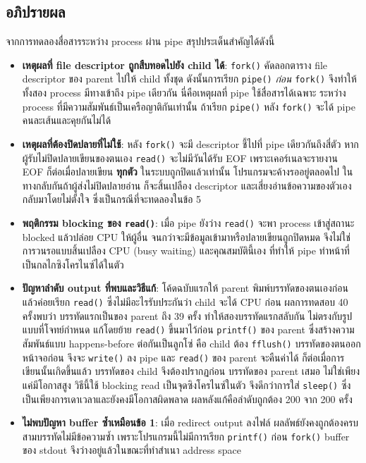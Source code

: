 \documentclass[a4paper,12pt]{article}
\newcommand{\code}[1]{\texttt{#1}}
\begin{document}
\subsection{อภิปรายผล}

จากการทดลองสื่อสารระหว่าง process ผ่าน pipe สรุปประเด็นสำคัญได้ดังนี้

\begin{itemize}[leftmargin=*]
  \item \textbf{เหตุผลที่ file descriptor ถูกสืบทอดไปยัง child ได้}:
        \code{fork()} คัดลอกตาราง file descriptor ของ parent ไปให้ child ทั้งชุด
        ดังนั้นการเรียก \code{pipe()} \emph{ก่อน} \code{fork()} จึงทำให้ทั้งสอง
        process มีทางเข้าถึง pipe เดียวกัน นี่คือเหตุผลที่ pipe ใช้สื่อสารได้เฉพาะ
        ระหว่าง process ที่มีความสัมพันธ์เป็นเครือญาติกันเท่านั้น
        ถ้าเรียก \code{pipe()} หลัง \code{fork()} จะได้ pipe คนละเส้นและคุยกันไม่ได้

  \item \textbf{เหตุผลที่ต้องปิดปลายที่ไม่ใช้}:
        หลัง \code{fork()} จะมี descriptor ชี้ไปที่ pipe เดียวกันถึงสี่ตัว
        หากผู้รับไม่ปิดปลายเขียนของตนเอง \code{read()} จะไม่มีวันได้รับ EOF
        เพราะเคอร์เนลจะรายงาน EOF ก็ต่อเมื่อปลายเขียน \textbf{ทุกตัว}
        ในระบบถูกปิดแล้วเท่านั้น โปรแกรมจะค้างรออยู่ตลอดไป
        ในทางกลับกันถ้าผู้ส่งไม่ปิดปลายอ่าน ก็จะสิ้นเปลือง descriptor
        และเสี่ยงอ่านข้อความของตัวเองกลับมาโดยไม่ตั้งใจ ซึ่งเป็นกรณีที่จะทดลองในข้อ 5

  \item \textbf{พฤติกรรม blocking ของ \code{read()}}:
        เมื่อ pipe ยังว่าง \code{read()} จะพา process เข้าสู่สถานะ blocked
        แล้วปล่อย CPU ให้ผู้อื่น จนกว่าจะมีข้อมูลเข้ามาหรือปลายเขียนถูกปิดหมด
        จึงไม่ใช่การวนรอแบบสิ้นเปลือง CPU (busy waiting) และคุณสมบัตินี้เอง
        ที่ทำให้ pipe ทำหน้าที่เป็นกลไกซิงโครไนซ์ได้ในตัว

  \item \textbf{ปัญหาลำดับ output ที่พบและวิธีแก้}:
        โค้ดฉบับแรกให้ parent พิมพ์บรรทัดของตนเองก่อนแล้วค่อยเรียก \code{read()}
        ซึ่งไม่มีอะไรรับประกันว่า child จะได้ CPU ก่อน ผลการทดสอบ 40 ครั้งพบว่า
        บรรทัดแรกเป็นของ parent ถึง 39 ครั้ง ทำให้สองบรรทัดแรกสลับกัน
        ไม่ตรงกับรูปแบบที่โจทย์กำหนด แก้โดยย้าย \code{read()} ขึ้นมาไว้ก่อน
        \code{printf()} ของ parent ซึ่งสร้างความสัมพันธ์แบบ happens-before
        ต่อกันเป็นลูกโซ่ คือ child ต้อง \code{fflush()} บรรทัดของตนออกหน้าจอก่อน
        จึงจะ \code{write()} ลง pipe และ \code{read()} ของ parent จะคืนค่าได้
        ก็ต่อเมื่อการเขียนนั้นเกิดขึ้นแล้ว บรรทัดของ child จึงต้องปรากฏก่อน
        บรรทัดของ parent เสมอ ไม่ใช่เพียงแค่มีโอกาสสูง
        วิธีนี้ใช้ blocking read เป็นจุดซิงโครไนซ์ในตัว จึงดีกว่าการใส่
        \code{sleep()} ซึ่งเป็นเพียงการเดาเวลาและยังคงมีโอกาสผิดพลาด
        ผลหลังแก้คือลำดับถูกต้อง 200 จาก 200 ครั้ง

  \item \textbf{ไม่พบปัญหา buffer ซ้ำเหมือนข้อ 1}:
        เมื่อ redirect output ลงไฟล์ ผลลัพธ์ยังคงถูกต้องครบสามบรรทัดไม่มีข้อความซ้ำ
        เพราะโปรแกรมนี้ไม่มีการเรียก \code{printf()} ก่อน \code{fork()}
        buffer ของ stdout จึงว่างอยู่แล้วในขณะที่ทำสำเนา address space
\end{itemize}
\newpage
\end{document}
